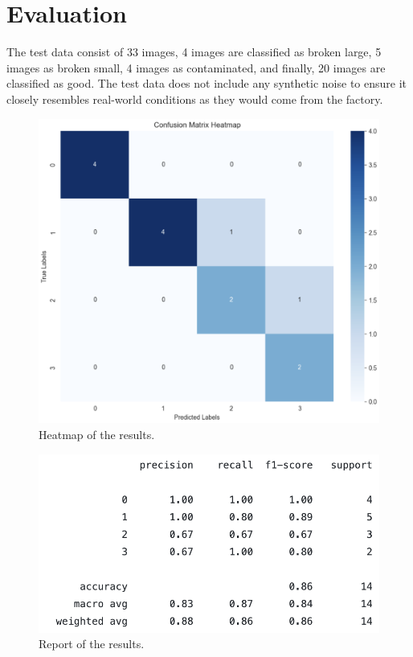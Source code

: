 \section{Evaluation}

The test data consist of 33 images, 4 images are classified as broken large, 5 images as broken small, 4 images as contaminated, and finally, 20 images are classified as good. The test data does not include any synthetic noise to ensure it closely resembles real-world conditions as they would come from the factory.
\begin{figure}[H]
    \centering
    \includegraphics[scale=0.32]{src/images/heatmap_results.png}
    \caption{Heatmap of the results.}
    \label{fig:heatmapresults}
\end{figure}

\begin{figure}[H]
    \centering
    \hspace{-1.4cm}  
    \includegraphics[scale=0.55]{src/images/class_report_result.png}
    \caption{Report of the results.}
    \label{fig:reportresults}
\end{figure}
